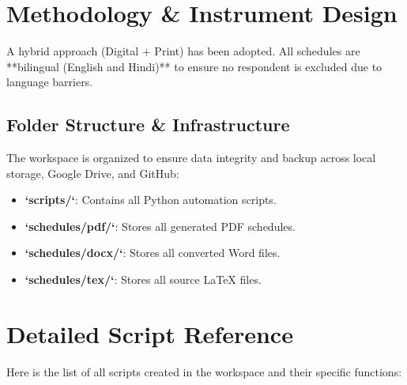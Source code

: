 \documentclass[11pt,a4paper]{article}
\begin{document}
\section{Methodology \& Instrument Design}
A hybrid approach (Digital + Print) has been adopted. All schedules are **bilingual (English and Hindi)** to ensure no respondent is excluded due to language barriers.

\subsection{Folder Structure \& Infrastructure}
The workspace is organized to ensure data integrity and backup across local storage, Google Drive, and GitHub:
\begin{itemize}
    \item \textbf{`scripts/`}: Contains all Python automation scripts.
    \item \textbf{`schedules/pdf/`}: Stores all generated PDF schedules.
    \item \textbf{`schedules/docx/`}: Stores all converted Word files.
    \item \textbf{`schedules/tex/`}: Stores all source LaTeX files.
\end{itemize}

\section{Detailed Script Reference}
Here is the list of all scripts created in the workspace and their specific functions:
\end{document}
